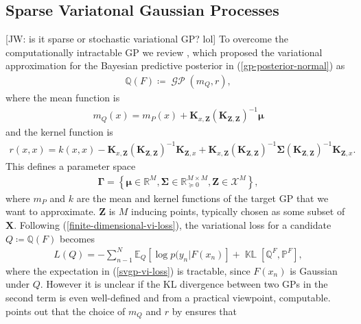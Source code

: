 \documentclass{article}
\newcommand{\jw}[1]{{\color{gray} [JW: #1]}}
\newcommand{\KLD}{\operatorname{\mathbb{KL}}}
\newcommand{\GP}{\operatorname{\mathcal{GP}}}
\numberwithin{equation}{section}
\begin{document}
\subsection{Sparse Variatonal Gaussian Processes}\label{section:svgp}
\jw{is it sparse or stochastic variational GP? lol}
To overcome the computationally intractable GP we review \cite{titsias2009variational}, which proposed the variational approximation for the Bayesian predictive posterior in (\ref{gp-posterior-normal}) as
\begin{align}
    \mathbb{Q}(F) \coloneqq \GP(m_Q, r),
\end{align}
where the mean function is
\begin{align}
    \label{svgp-mean}
    m_Q(x) = m_P(x) + \mathbf{K}_{x, \mathbf{Z}}\left(\mathbf{K}_{\mathbf{Z}, \mathbf{Z}}\right)^{-1} \boldsymbol{\mu}
\end{align}
and the kernel function is
\begin{align}
r(x, x) = k(x, x) - \mathbf{K}_{x, \mathbf{Z}}\left(\mathbf{K}_{\mathbf{Z}, \mathbf{Z}}\right)^{-1} \mathbf{K}_{\mathbf{Z}, x} + \mathbf{K}_{x, \mathbf{Z}}\left(\mathbf{K}_{\mathbf{Z}, \mathbf{Z}}\right)^{-1}\mathbf{\Sigma}\left(\mathbf{K}_{\mathbf{Z}, \mathbf{Z}}\right)^{-1} \mathbf{K}_{\mathbf{Z}, x}.
\label{svgp-covariance}
\end{align}
This defines a parameter space
\begin{align}
    \mathbf{\Gamma} = \left\{\boldsymbol{\mu} \in \mathbb{R}^{M}, \mathbf{\Sigma} \in \mathbb{R}^{M\times M}_{\succcurlyeq 0}, \mathbf{Z} \in \mathcal{X}^M \right\},
    \label{svgp-parameter-space}
\end{align}
where $m_P$ and $k$ are the mean and kernel functions of the target GP that we want to approximate. $\mathbf{Z}$ is $M$ inducing points, typically chosen as some subset of $\mathbf{X}$.
Following (\ref{finite-dimensional-vi-loss}), the variational loss for a candidate $Q \coloneqq \mathbb{Q}(F)$ becomes
\begin{align}
L(Q) = -\sum_{n-1}^N \mathbb{E}_Q \left[\log p(y_n \vert F(x_n)\right] + \KLD\left[\mathbb{Q}^F, \mathbb{P}^F\right],
\label{svgp-vi-loss}
\end{align}
where the expectation in (\ref{svgp-vi-loss}) is tractable, since $F(x_n)$ is Gaussian under $Q$.
However it is unclear if the KL divergence between two GPs in the second term is even well-defined and from a practical viewpoint, computable.
\cite{matthews2016sparse} points out that the choice of $m_Q$ and $r$ by \cite{titsias2009variational} ensures that
\end{document}

